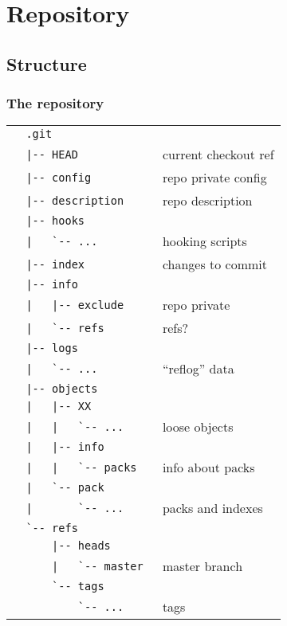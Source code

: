 \documentclass[english]{beamer}
\newcommand{\mysection}[2]{%
  \hypertarget{#2}{}%
  \section{#1}%
  \label{#2}%
}
\newcommand{\mysubsection}[2]{%
  \hypertarget{#2}{}%
  \subsection{#1}%
  \label{#2}%
}
\begin{document}
\mysection{Repository}{_repository}
\mysubsection{Structure}{repo:structure}
\begin{frame}[fragile]
\frametitle{The repository}
{\tiny
\begin{tabular}{ll}
        \verb!  .git               !  & \\
        \verb!  |-- HEAD           !  & current checkout ref \\
        \verb!  |-- config         !  & repo private config \\
        \verb!  |-- description    !  & repo description \\
        \verb!  |-- hooks          !  & \\
        \verb!  |   `-- ...        !  & hooking scripts \\
        \verb!  |-- index          !  & changes to commit \\
        \verb!  |-- info           !  & \\
        \verb!  |   |-- exclude    !  & repo private \\
        \verb!  |   `-- refs       !  & refs? \\
        \verb!  |-- logs           !  & \\
        \verb!  |   `-- ...        !  & ``reflog'' data \\
        \verb!  |-- objects        !  & \\
        \verb!  |   |-- XX         !  & \\
        \verb!  |   |   `-- ...    !  & loose objects \\
        \verb!  |   |-- info       !  & \\
        \verb!  |   |   `-- packs  !  & info about packs \\
        \verb!  |   `-- pack       !  & \\
        \verb!  |       `-- ...    !  & packs and indexes \\
        \verb!  `-- refs           !  & \\
        \verb!      |-- heads      !  & \\
        \verb!      |   `-- master !  & master branch \\
        \verb!      `-- tags       !  & \\
        \verb!          `-- ...    !  & tags \\
\end{tabular}
}
\end{frame}
\end{document}
